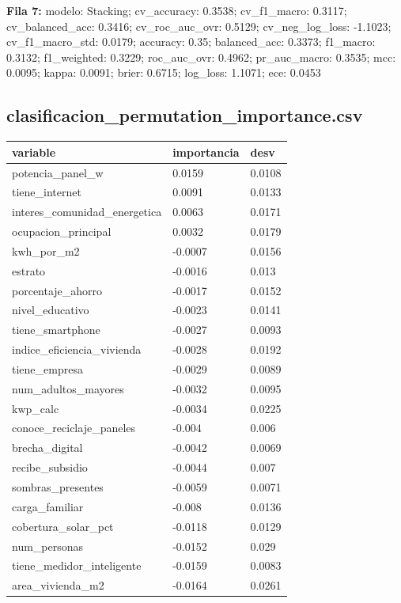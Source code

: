 {\footnotesize\textbf{Fila 7:} modelo: Stacking; cv\_accuracy: 0.3538; cv\_f1\_macro: 0.3117; cv\_balanced\_acc: 0.3416; cv\_roc\_auc\_ovr: 0.5129; cv\_neg\_log\_loss: -1.1023; cv\_f1\_macro\_std: 0.0179; accuracy: 0.35; balanced\_acc: 0.3373; f1\_macro: 0.3132; f1\_weighted: 0.3229; roc\_auc\_ovr: 0.4962; pr\_auc\_macro: 0.3535; mcc: 0.0095; kappa: 0.0091; brier: 0.6715; log\_loss: 1.1071; ece: 0.0453\par}
\subsection*{clasificacion\_permutation\_importance.csv}
{\footnotesize\begin{longtable}{@{}p{}ll@{}}
\toprule
variable & importancia & desv \\
\midrule\endhead
potencia\_panel\_w & 0.0159 & 0.0108 \\
tiene\_internet & 0.0091 & 0.0133 \\
interes\_comunidad\_energetica & 0.0063 & 0.0171 \\
ocupacion\_principal & 0.0032 & 0.0179 \\
kwh\_por\_m2 & -0.0007 & 0.0156 \\
estrato & -0.0016 & 0.013 \\
porcentaje\_ahorro & -0.0017 & 0.0152 \\
nivel\_educativo & -0.0023 & 0.0141 \\
tiene\_smartphone & -0.0027 & 0.0093 \\
indice\_eficiencia\_vivienda & -0.0028 & 0.0192 \\
tiene\_empresa & -0.0029 & 0.0089 \\
num\_adultos\_mayores & -0.0032 & 0.0095 \\
kwp\_calc & -0.0034 & 0.0225 \\
conoce\_reciclaje\_paneles & -0.004 & 0.006 \\
brecha\_digital & -0.0042 & 0.0069 \\
recibe\_subsidio & -0.0044 & 0.007 \\
sombras\_presentes & -0.0059 & 0.0071 \\
carga\_familiar & -0.008 & 0.0136 \\
cobertura\_solar\_pct & -0.0118 & 0.0129 \\
num\_personas & -0.0152 & 0.029 \\
tiene\_medidor\_inteligente & -0.0159 & 0.0083 \\
area\_vivienda\_m2 & -0.0164 & 0.0261 \\

\end{longtable}}
